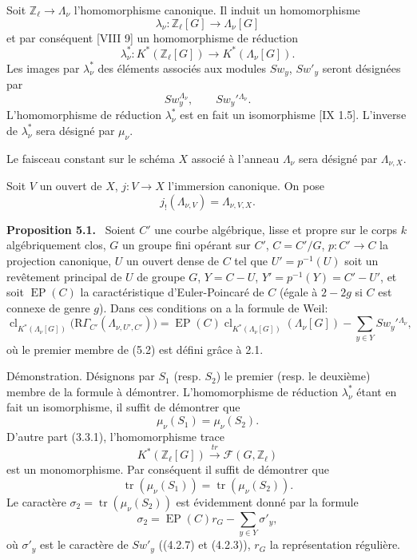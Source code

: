 \documentclass[11pt]{article}
\newenvironment{statement}[1]{\par\medskip\noindent\textbf{#1.}\ }{\par\medskip}
\providecommand{\EP}{\operatorname{EP}}
\providecommand{\EP}{\operatorname{EP}}
\providecommand{\clKstar}[1]{\operatorname{cl}_{K^*(#1)}}
\providecommand{\RG}{\mathrm R\Gamma}
\begin{document}
Soit $\mathbb Z_\ell\to\Lambda_\nu$ l'homomorphisme canonique. Il induit un homomorphisme
\[
\lambda_\nu:\mathbb Z_\ell[G]\longrightarrow \Lambda_\nu[G]
\]
et par conséquent [VIII 9] un homomorphisme de réduction
\[
\lambda_\nu^*:K^*(\mathbb Z_\ell[G])\longrightarrow K^*(\Lambda_\nu[G]).
\]
Les images par $\lambda_\nu^*$ des éléments associés aux modules $Sw_y$, $Sw'_y$ seront désignées par
\[
Sw_y^{\Lambda_\nu},\qquad Sw_y'{}^{\Lambda_\nu}.
\]
L'homomorphisme de réduction $\lambda_\nu^*$ est en fait un isomorphisme [IX 1.5]. L'inverse de $\lambda_\nu^*$ sera désigné par $\mu_\nu$.

Le faisceau constant sur le schéma $X$ associé à l'anneau $\Lambda_\nu$ sera désigné par $\Lambda_{\nu,X}$.

Soit $V$ un ouvert de $X$, $j:V\to X$ l'immersion canonique. On pose
\[
j_!(\Lambda_{\nu,V})=\Lambda_{\nu,V,X}.
\]

\begin{statement}{Proposition 5.1}
Soient $C'$ une courbe algébrique, lisse et propre sur le corps $k$ algébriquement clos, $G$ un groupe fini opérant sur $C'$, $C=C'/G$, $p:C'\to C$ la projection canonique, $U$ un ouvert dense de $C$ tel que $U'=p^{-1}(U)$ soit un revêtement principal de $U$ de groupe $G$, $Y=C-U$, $Y'=p^{-1}(Y)=C'-U'$, et soit $\EP(C)$ la caractéristique d'Euler-Poincaré de $C$ (égale à $2-2g$ si $C$ est connexe de genre $g$).
Dans ces conditions on a la formule de Weil:
\[
\clKstar{\Lambda_\nu[G]}\bigl(\RG_{C'}(\Lambda_{\nu,U',C'})\bigr)
=
\EP(C)\clKstar{\Lambda_\nu[G]}(\Lambda_\nu[G])
-\sum_{y\in Y}Sw_y'{}^{\Lambda_\nu},
\tag{5.2}
\]
où le premier membre de (5.2) est défini grâce à 2.1.
\end{statement}

Démonstration. Désignons par $S_1$ (resp. $S_2$) le premier (resp. le deuxième) membre de la formule à démontrer. L'homomorphisme de réduction $\lambda_\nu^*$ étant en fait un isomorphisme, il suffit de démontrer que
\[
\mu_\nu(S_1)=\mu_\nu(S_2).
\]
D'autre part (3.3.1), l'homomorphisme trace
\[
K^*(\mathbb Z_\ell[G])\xrightarrow{\ tr\ }\mathcal F(G,\mathbb Z_\ell)
\]
est un monomorphisme. Par conséquent il suffit de démontrer que
\[
\operatorname{tr}(\mu_\nu(S_1))=\operatorname{tr}(\mu_\nu(S_2)).
\]
Le caractère $\sigma_2=\operatorname{tr}(\mu_\nu(S_2))$ est évidemment donné par la formule
\[
\sigma_2=\EP(C)r_G-\sum_{y\in Y}\sigma'_y,
\tag{5.2.1}
\]
où $\sigma'_y$ est le caractère de $Sw'_y$ ((4.2.7) et (4.2.3)), $r_G$ la représentation régulière.
\end{document}
